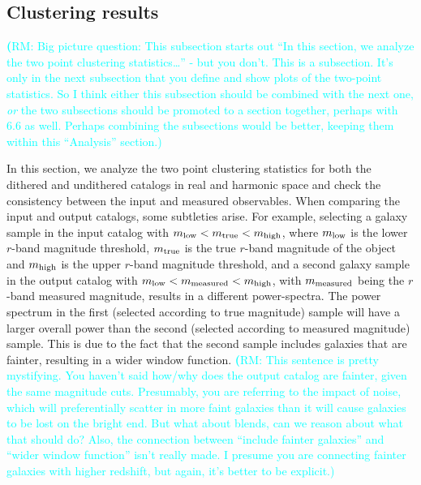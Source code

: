\documentclass[twocolumn]{aastex62}
\newcommand{\rachel}[1]{{\textcolor{cyan}{{\textbf (RM: #1)}}}}
\begin{document}
\subsection{Clustering results}
\label{sec:results}

\rachel{Big picture question: This subsection starts out ``In this section, we analyze the two point clustering statistics\dots'' - but you don't.  This is a subsection.  It's only in the next subsection that you define and show plots of the two-point statistics.  So I think either this subsection should be combined with the next one, {\em or} the two subsections should be promoted to a section together, perhaps with 6.6 as well.  Perhaps combining the subsections would be better, keeping them within this ``Analysis'' section.}

In this section, we analyze the two point clustering statistics for both the dithered and undithered catalogs in real and harmonic space and check the consistency between the input and measured observables. When comparing the input and output catalogs, some subtleties arise. For example, selecting a galaxy sample in the input catalog with $m_{\rm low} < m_{\rm true} < m_{\rm high}$, where $m_{\rm low}$ is the lower $r$-band magnitude threshold, $m_{\rm true}$ is the true $r$-band magnitude of the object and $m_{\rm high}$ is the upper $r$-band magnitude threshold, and a second galaxy sample in the output catalog with $m_{\rm low} < m_{\rm measured} < m_{\rm high}$, with $m_{\rm measured}$ being the $r$-band measured magnitude, results in a different power-spectra. The power spectrum in the first (selected according to true magnitude) sample will have a larger overall power than the second (selected according to measured magnitude) sample. This is due to the fact that the second sample includes galaxies that are fainter, resulting in a wider window function. \rachel{This sentence is pretty mystifying.  You haven't said how/why does the output catalog are fainter, given the same magnitude cuts.  Presumably, you are referring to the impact of noise, which will preferentially scatter in more faint galaxies than it will cause galaxies to be lost on the bright end.  But what about blends, can we reason about what that should do?  Also, the connection between ``include fainter galaxies'' and ``wider window function'' isn't really made.  I presume you are connecting fainter galaxies with higher redshift, but again, it's better to be explicit.}
\end{document}
